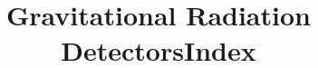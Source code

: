\documentclass{ws-book975x65}
\title{Gravitational Radiation Detectors}              %
\begin{document}






\tableofcontents



\setcounter{page}{1}


%


%

%



%


% 

\blankpage                         %
\title{Index}                      %
\printindex
\end{document}
